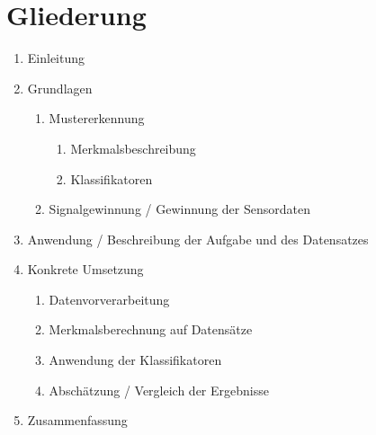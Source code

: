 \documentclass[12pt,a4paper]{report}
\begin{document}
\chapter*{Gliederung}
\begin{enumerate}
\item Einleitung
\item Grundlagen
    \begin{enumerate}
    \item Mustererkennung
        \begin{enumerate}
        \item Merkmalsbeschreibung
        \item Klassifikatoren
        \end{enumerate}
    \item Signalgewinnung / Gewinnung der Sensordaten
    \end{enumerate}
\item Anwendung / Beschreibung der Aufgabe und des Datensatzes
\item Konkrete Umsetzung
    \begin{enumerate}
    \item Datenvorverarbeitung
    \item Merkmalsberechnung auf Datens\"atze
    \item Anwendung der Klassifikatoren
    \item Absch\"atzung / Vergleich der Ergebnisse
    \end{enumerate}
\item Zusammenfassung
\end{enumerate}






\end{document}
